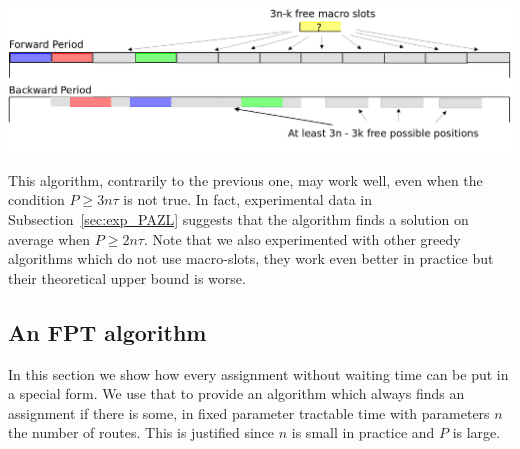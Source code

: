\documentclass[a4paper,10pt]{article}
\begin{document}
{      \begin{center}
      \includegraphics[width=\textwidth]{ex3nt.png}
      \end{center}
% 
% 
% 
	
This algorithm, contrarily to the previous one, may work well, even when the condition $P \geq 3n\tau$ is not true.
In fact, experimental data in Subsection~\ref{sec:exp_PAZL} suggests that the algorithm finds a solution on average when $P \geq 2 n\tau$.
Note that we also experimented with other greedy algorithms which do not use macro-slots, they work even better in practice but their theoretical upper bound is worse.

\subsection*{An FPT algorithm}

In this section we show how every assignment without waiting time can be put in a special form.
We use that to provide an algorithm which always finds an assignment if there is some, in fixed parameter 
tractable time with parameters $n$ the number of routes. This is justified since $n$ is small in practice and $P$ is large.

}
\end{document}
